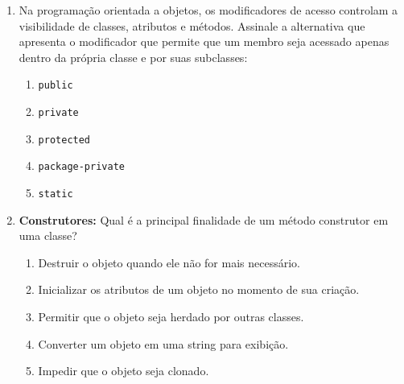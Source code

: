 \documentclass[12pt,a4paper]{article}
\newcommand{\resposta}[1]{
\noindent
\framebox[\textwidth]{
\begin{minipage}{0.98\textwidth}
\vspace{#1}
\end{minipage}
}
}
\begin{document}
\begin{enumerate}
    \begin{center} 
    \end{center}

    \resposta{16cm}
    \item Na programação orientada a objetos, os modificadores de acesso controlam a visibilidade de classes, atributos e métodos. Assinale a alternativa que apresenta o modificador que permite que um membro seja acessado apenas dentro da própria classe e por suas subclasses:
    \begin{enumerate}[label=\Alph*)]
        \item \texttt{public}
        \item \texttt{private}
        \item \texttt{protected}
        \item \texttt{package-private}
        \item \texttt{static}
    \end{enumerate}

    \item \textbf{Construtores:} Qual é a principal finalidade de um método construtor em uma classe?
    \begin{enumerate}[label=\Alph*)]
        \item Destruir o objeto quando ele não for mais necessário.
        \item Inicializar os atributos de um objeto no momento de sua criação.
        \item Permitir que o objeto seja herdado por outras classes.
        \item Converter um objeto em uma string para exibição.
        \item Impedir que o objeto seja clonado.
    \end{enumerate}



\end{enumerate}
\end{document}
